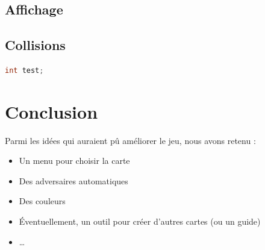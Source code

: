 \documentclass[12pt]{article}
\begin{document}
		\subsection{Affichage}
		
		\subsection{Collisions}
		
		
		\begin{lstlisting}[language=C, title={Programme en C}]
			int test;
		\end{lstlisting}

	\section{Conclusion}

	Parmi les idées qui auraient pû améliorer le jeu, nous avons retenu :
	\begin{itemize}
		\item Un menu pour choisir la carte
		\item Des adversaires automatiques
		\item Des couleurs
		\item Éventuellement, un outil pour créer d'autres cartes (ou un guide)
		\item \dots
	\end{itemize}
		
\end{document}
